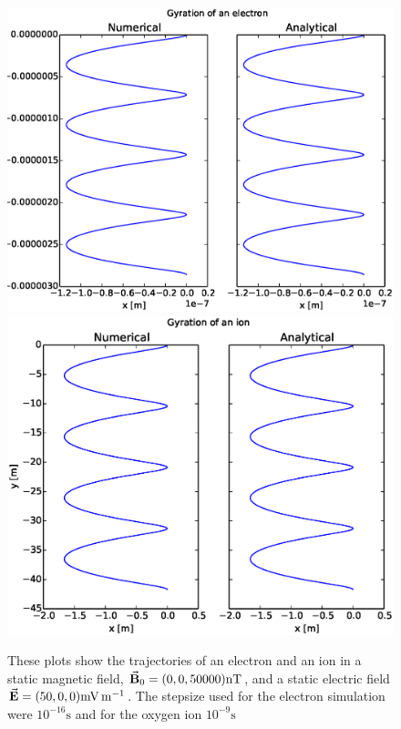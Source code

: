 \documentclass[x11names]{article}
\begin{document}
      \begin{figure}
            \includegraphics[width = 0.5\linewidth]{../source/ExBelectron}
            \includegraphics[width = 0.5\linewidth]{../source/ExBion}
            \caption{These plots show the trajectories of an electron and an ion in a static magnetic field, \(\va{B}_0 = (0,0,50000) \si{\nano\tesla}\), and a static electric field \( \va{E} = (50,0,0)  \si{\milli\volt\per\meter}\). The stepsize used for the electron simulation were \(10^{-16} \si{\second}\) and for the oxygen ion \(10^{-9} \si{\second}\)}
      \end{figure}

\appendix
\end{document}
